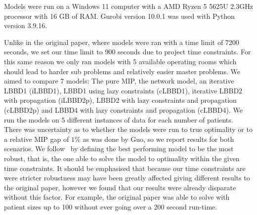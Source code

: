 Models were run on a Windows 11 computer with a AMD Ryzen 5 5625U 2.3GHz processor with 16 GB of RAM\@. Gurobi version 10.0.1 was used with Python version 3.9.16. 

Unlike in the original paper, where models were ran with a time limit of 7200 seconds, we set our time limit to 900 seconds due to project time constraints. For this same reason we only ran models with 5 available operating rooms which should lead to harder sub problems and relatively easier master problems\cite{roshanaei2017propagating}. We aimed to compare 7 models: The pure MIP, the network model, an iterative LBBD1 (iLBBD1), LBBD1 using lazy constraints (cLBBD1), iterative LBBD2 with propagation (iLBBD2p), LBBD2 with lazy constraints and propagation (cLBBD2p) and LBBD4 with lazy constraints and propagation (cLBBD4). We run the models on 5 different instances of data for each number of patients. There was uncertainty as to whether the models were run to true optimality or to a relative MIP gap of $1\%$ as was done by Guo\cite{guo}, so we report results for both scenarios. We follow~\cite{roshanaei2017propagating} by defining the best performing model to be the most robust, that is, the one able to solve the model to optimality within the given time constraints.
It should be emphasised that because our time constraints are were stricter robustness may have been greatly affected giving different results to the original paper, however we found that our results were already disparate without this factor. For example, the original paper was able to solve with patient sizes up to 100 without ever going over a 200 second run-time.



